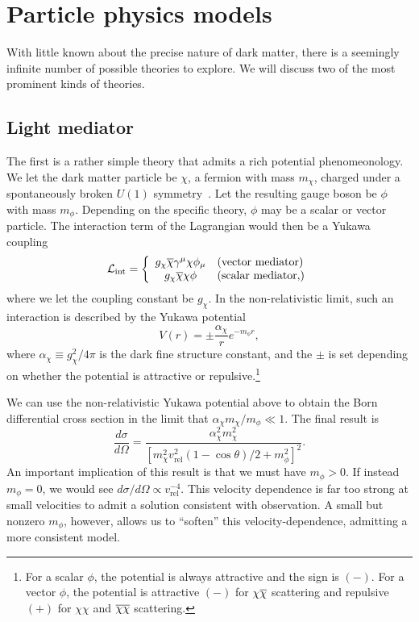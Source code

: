 \section{Particle physics models}
With little known about the precise nature of dark matter, there is a seemingly
infinite number of possible theories to explore. We will discuss two of the
most prominent kinds of theories.

\subsection{Light mediator}
The first is a rather simple theory that admits a rich potential phenomeonology.
We let the dark matter particle be $\chi$, a fermion with mass $m_\chi$, charged
under a spontaneously broken $U(1)$ symmetry~\cite{tulin_dark_2018}. Let the
resulting gauge boson be $\phi$ with mass $m_\phi$. Depending on the specific
theory, $\phi$ may be a scalar or vector particle. The interaction term of the
Lagrangian would then be a Yukawa coupling
\begin{equation}
    \mathcal{L}_\text{int} = \left\{ \begin{array}{cl}
        g_\chi \overline{\chi} \gamma^\mu \chi \phi_\mu & (\text{vector mediator}) \\
        g_\chi \overline{\chi} \chi \phi & (\text{scalar mediator,})
    \end{array} \right.
\end{equation}
where we let the coupling constant be $g_\chi$. In the non-relativistic limit,
such an interaction is described by the Yukawa 
potential~\cite{tulin_beyond_2013, tulin_resonant_2013}
\begin{equation}
    V(r) = \pm \frac{\alpha_\chi}{r} e^{-m_\phi r},
\end{equation}
where $\alpha_\chi \equiv g_\chi^2 / 4\pi$ is the dark fine structure constant,
and the $\pm$ is set depending on whether the potential is attractive or
repulsive.\footnote{For a scalar $\phi$, the potential is always attractive and
the sign is $(-)$. For a vector $\phi$, the potential is attractive $(-)$ for
$\chi\overline{\chi}$ scattering and repulsive $(+)$ for $\chi\chi$ and $\overline{\chi}\overline{\chi}$
scattering.}

We can use the non-relativistic Yukawa potential above to obtain the Born
differential cross section in the limit that $\alpha_\chi m_\chi / m_\phi \ll
1$. The final result is~\cite{tulin_dark_2018}
\begin{equation}
    \frac{d\sigma}{d\Omega}
    = \frac{\alpha_\chi^2 m_\chi^2}{\left[ m_\chi^2 v_{\text{rel}}^2 (1 - \cos\theta) / 2 + m_\phi^2 \right]^2}.
\end{equation}
An important implication of this result is that we must have $m_\phi > 0$. If
instead $m_\phi = 0$, we would see $d\sigma/d\Omega \propto
v_{\text{rel}}^{-4}$. This velocity dependence is far too strong at small
velocities to admit a solution consistent with observation. A small but nonzero
$m_\phi$, however, allows us to ``soften'' this velocity-dependence, admitting a
more consistent model.

